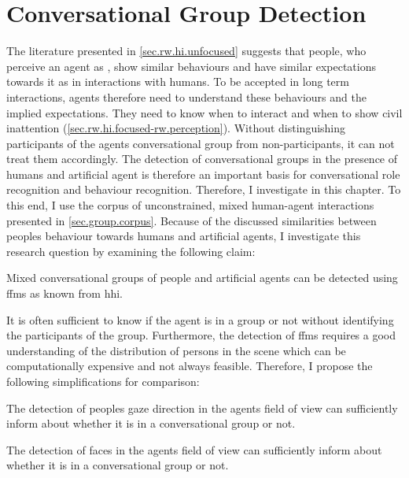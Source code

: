 \chapter{Conversational Group Detection}\label{ch.fformation}

The literature presented in \cref{sec.rw.hi.unfocused} suggests that people, who perceive an agent as , show similar behaviours and have similar expectations towards it as in interactions with humans.
To be accepted in long term interactions, agents therefore need to understand these behaviours and the implied expectations.
They need to know when to interact and when to show \gls{civil inattention} (\cref{sec.rw.hi.focused-rw.perception}).
Without distinguishing participants of the agents \gls{conversational group} from \glspl{non-participant}, it can not treat them accordingly. 
The detection of \glspl{conversational group} in the presence of humans and \gls{artificial agent} is therefore an important basis for \gls{conversational role} recognition and behaviour recognition.
Therefore, I investigate  in this chapter.
To this end, I use the corpus of unconstrained, mixed human-agent interactions presented in \cref{sec.group.corpus}. 
Because of the discussed similarities between peoples behaviour towards humans and \glspl{artificial agent}, I investigate this research question by examining the following claim: 
\newcommand{\hypffmone}{Mixed \glspl{conversational group} of people and \glspl{artificial agent} can be detected using \glspl{ffm} as known from \gls{hhi}.}
\begin{hyp3}
    \label{ffm.h1}
    \hypffmone
\end{hyp3}
It is often sufficient to know if the agent is in a group or not without identifying the participants of the group. 
Furthermore, the detection of \glspl{ffm} requires a good understanding of the distribution of persons in the scene which can be computationally expensive and not always feasible.
Therefore, I propose the following simplifications for comparison:
\newcommand{\hypffmgaze}{The detection of peoples ga\-ze di\-rec\-tion in the agents field of view can sufficiently inform about whether it is in a \gls{conversational group} or not.}
\begin{hyp3}
    \label{ffm.gaze}
    \hypffmgaze
\end{hyp3}
\newcommand{\hypffmface}{The detection of faces in the agents field of view can sufficiently inform about whether it is in a \gls{conversational group} or not.}
\begin{hyp3}
    \label{ffm.face}
    \hypffmface
\end{hyp3}


